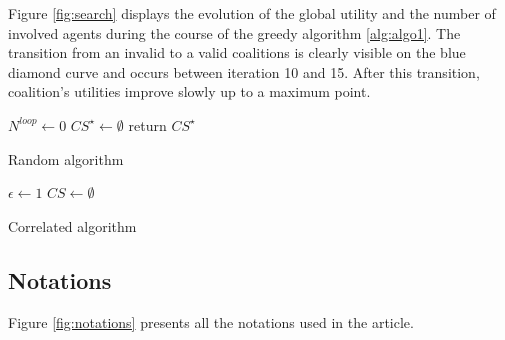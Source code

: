 \documentclass[journal]{IEEEtran}
\begin{document}
Figure \ref{fig:search} displays the evolution of the global utility and the number of involved agents during the course of the greedy algorithm \ref{alg:algo1}. The transition from an invalid to a valid coalitions is clearly visible on the blue diamond curve and occurs between iteration 10 and 15. After this transition, coalition's utilities improve slowly up to a maximum point. 



\begin{algorithm}
 $ N^{loop} \leftarrow 0 $ \;
 $ CS^{\star} \leftarrow \emptyset $\;
  return $ CS^{\star} $
 \caption{Random algorithm}
 \label{alg:algo2}
\end{algorithm}



\begin{algorithm}
 $ \epsilon \leftarrow 1 $ \;
 $ CS \leftarrow \emptyset $\;
 \caption{Correlated algorithm}
\label{alg:algo3}
\end{algorithm}



\subsection{Notations}

\noindent Figure \ref{fig:notations} presents all the notations used in the article.
 
 
 
\end{document}
